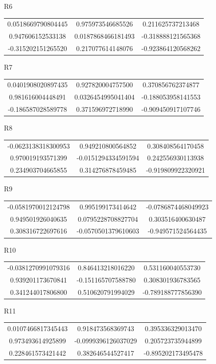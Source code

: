 \documentclass[12pt]{article}
\begin{document}
R6
\begin{tabular}{|c|c|c|}
\hline
0.0518669790804445 & 0.975973546685526 &	0.211625737213468 \\
0.947606152533138 &	0.0187868466181493 &	-0.318888121565368 \\
-0.315202151265520 & 0.217077614148076 &	-0.923864120568262 \\
\hline
\end{tabular}

R7
\begin{tabular}{|c|c|c|}
\hline
0.0401908020897435 &	0.927820004757500 &	0.370856762374877 \\
0.981616004448491 &	0.0326454995041404 &	-0.188053958141553 \\
-0.186587028589778 &	0.371596972718990 &	-0.909450917107746 \\
\hline
\end{tabular}

R8
\begin{tabular}{|c|c|c|}
\hline
-0.0623138318300953 &	0.949210800564852 &	0.308408564170458 \\
0.970019193571399 &	-0.0151294334591594 &	0.242556930113938 \\
0.234903704665855 &	0.314276878459485 &	-0.919809922320921 \\
\hline
\end{tabular}

R9
\begin{tabular}{|c|c|c|}
\hline
-0.0581970012124798	& 0.995199173414642 &	-0.0786874468049923 \\
0.949501926040635 &	0.0795228708827704 &	0.303516400630487 \\
0.308316722697616 &	-0.0570501379610603 &	-0.949571524564435 \\
\hline
\end{tabular}

R10
\begin{tabular}{|c|c|c|}
\hline
-0.0381270991079316 &	0.846413218016220 &	0.531160040553730 \\
0.939201173670841 &	-0.151165707588780 &	0.308301936783565 \\
0.341244017806800 &	0.510620791994029 &	-0.789188777856390 \\
\hline
\end{tabular}

R11
\begin{tabular}{|c|c|c|}
\hline
0.0107466817345443 &	0.918473568369743 &	0.395336329013470 \\
0.973493614925899 &	-0.0999396126037029 &	0.205723735944899 \\
0.228461573421442 &	0.382646544527417 &	-0.895202173495478 \\
\hline
\end{tabular}
\end{document}
